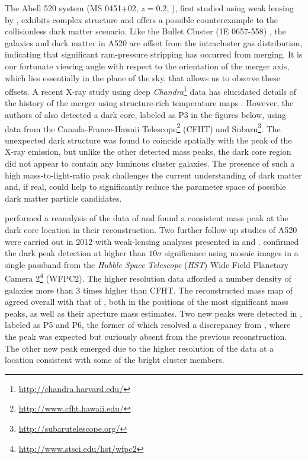 \documentclass[iop,twocolappendix]{emulateapj}
\newcommand{\cta}[1]{\citetalias{#1}}
\begin{document}
The Abell 520 system (MS 0451+02, $z=0.2$, \citet{Abell1989}), first studied using weak lensing by 
\citet[hereafter M07]{M07}, exhibits complex structure and
offers a possible counterexample to the collisionless dark matter scenario. 
Like the Bullet Cluster (1E 0657-558) \citep{MGL.etal.2002}, the galaxies and dark matter in A520 are 
offset from the intracluster gas distribution, indicating that significant ram-pressure stripping has 
occurred from merging. 
It is our fortunate viewing angle with respect to the orientation of the merger axis, which lies 
essentially in the plane of the sky, that allows us to observe these offsets.
A recent X-ray study using deep
\textit{Chandra}\footnote{\url{http://chandra.harvard.edu/}} data has elucidated details of the history 
of the merger using structure-rich temperature maps \citep{WMG.2016}.
However, the authors of \cta{M07} also detected a dark core, labeled as P3 in the figures below,
using data from the Canada-France-Hawaii Telescope\footnote{\url{http://www.cfht.hawaii.edu/}} (CFHT) 
and Subaru\footnote{\url{http://subarutelescope.org/}}. 
The unexpected dark structure was found to coincide 
spatially with the peak of the X-ray emission, but unlike the other detected mass peaks, the dark 
core region did not appear to contain any luminous cluster galaxies. The presence of such a high 
mass-to-light-ratio peak challenges the current understanding of dark matter and, if real, could 
help to significantly reduce the parameter space of possible dark matter particle candidates.

\citet{OU.2008} performed a reanalysis of the data of \cta{M07} and found a 
consistent mass peak at the dark core location in their reconstruction.
Two further follow-up studies of A520 were carried out in 2012 with weak-lensing analyses 
presented in \citet[hereafter J12]{J12} and \citet[hereafter C12]{C12}. 
\cta{J12} confirmed the dark peak detection at higher than $10\sigma$ 
significance using mosaic images in a single passband from the
\textit{Hubble Space Telescope} (\textit{HST}) Wide Field Planetary Camera
2\footnote{\url{http://www.stsci.edu/hst/wfpc2}} (WFPC2). 
The higher resolution
data afforded a number density of galaxies more than 3 times higher than CFHT. The reconstructed 
mass map of \cta{J12} agreed overall with that of \cta{M07}, both in the 
positions of the most significant mass peaks, as well as their aperture mass estimates.
Two new peaks were detected in \cta{J12}, labeled as P5 and P6, the former of which resolved a 
discrepancy from 
\cta{M07}, where the peak was expected but curiously absent from the previous reconstruction.
The other new peak emerged due to the higher resolution of the data at a location consistent with
some of the bright cluster members.
\end{document}
